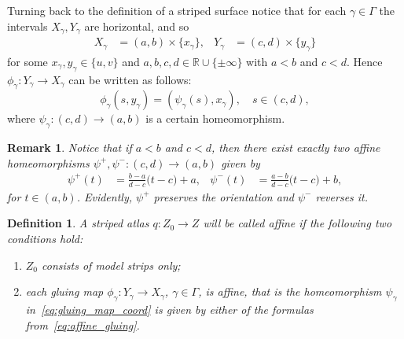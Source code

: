 \documentclass[12pt, reqno]{amsart}
\newcommand{\definitionname}{Definition}%
\newcommand{\remarkname}{Remark}%
\newtheorem{definition}[subsection]{\protect\definitionname}
\newtheorem{remark}[subsection]{\protect\remarkname}
\newcommand{\bR}{\mathbb{R}}
\newcommand{\stripSurf}{Z}
\newcommand{\preStripSurf}{\stripSurf_0}
\newcommand{\bdX}{X}
\newcommand{\bdY}{Y}
\newcommand{\bdGlueInd}{{\gamma}}
\newcommand{\BdGlueInd}{\Gamma}
\newcommand{\qmap}{q}
\begin{document}
Turning back to the definition of a striped surface notice that for each $\bdGlueInd \in \BdGlueInd$ the intervals $\bdX_{\bdGlueInd}, \bdY_{\bdGlueInd}$ are horizontal, and so
\begin{align*}
\bdX_{\bdGlueInd} &=(a,b) \times \{x_\bdGlueInd\}, &
\bdY_{\bdGlueInd} &= (c,d) \times \{y_\bdGlueInd\}
\end{align*}
for some $x_\bdGlueInd, y_\bdGlueInd \in \{u, v\}$ and $a,b, c,d \in \bR\cup \{\pm\infty\}$ with $a<b$ and $c<d$.
Hence $\phi_\bdGlueInd : \bdY_\bdGlueInd \to \bdX_\bdGlueInd$ can be written as follows:
\begin{equation}\label{eq:gluing_map_coord}
\phi_\bdGlueInd(s, y_\bdGlueInd) = (\psi_\bdGlueInd(s), x_\bdGlueInd), \quad s\in (c,d),
\end{equation}
where $\psi_\bdGlueInd:(c,d)\to(a,b)$ is a certain homeomorphism.

\begin{remark}\label{rem:affine_gluing}
Notice that if $a<b$ and $c<d$, then there exist exactly two \textit{affine} homeomorphisms $\psi^{+}, \psi^{-}: (c,d) \to (a,b)$ given by 
\begin{align}\label{eq:affine_gluing}
\psi^{+}(t)&= \frac{b-a}{d-c}\bigl(t - c \bigr) + a,
&
\psi^{-}(t)&= \frac{a-b}{d-c}\bigl(t - c \bigr) + b,
\end{align}
for $t\in(a,b)$.
Evidently, $\psi^{+}$ preserves the orientation and $\psi^{-}$ reverses it.
\end{remark}


\begin{definition}
A striped atlas $\qmap:\preStripSurf\to\stripSurf$ will be called \emph{affine} if the following two conditions hold:
\begin{enumerate}[label=$(\alph*)$, leftmargin=*]
\item 
$\preStripSurf$ consists of model strips only;
\item 
each gluing map $\phi_{\bdGlueInd}: \bdY_{\bdGlueInd} \to \bdX_{\bdGlueInd}$, $\bdGlueInd \in \BdGlueInd$, is \emph{affine}, that is the homeomorphism $\psi_\bdGlueInd$ in~\eqref{eq:gluing_map_coord} is given by either of the formulas from~\eqref{eq:affine_gluing}.
\end{enumerate}
\end{definition}
\end{document}
